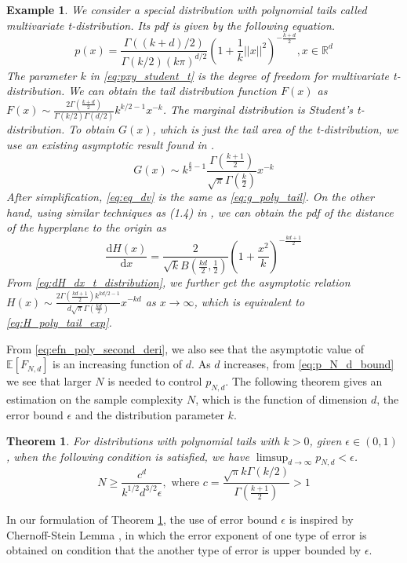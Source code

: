 \documentclass[conference,a4paper]{IEEEtran}
\def\E{\mathbb{E}}
\def\dd{\mathrm{d}}
\newtheorem{theorem}{Theorem}
\newtheorem{example}{Example}
\begin{document}
\begin{example}
     We consider a special distribution with polynomial tails called multivariate t-distribution.
     Its pdf is given by the following equation.
     \begin{equation}\label{eq:pxy_student_t}
          p(x) = \frac{\Gamma((k+d)/2)}{\Gamma(k/2)(k\pi)^{d/2}}
          \left(1+\frac{1}{k}||x||^2
          \right)^{-\frac{k+d}{2}}, x \in \mathbb{R}^d
      \end{equation}
      The parameter $k$ in \eqref{eq:pxy_student_t} is the degree of freedom for multivariate t-distribution.
      We can obtain the tail distribution function
      $F(x)$ as $F(x) \sim \frac{2\Gamma(\frac{k+d}{2})}{\Gamma(k/2)\Gamma(d/2)} k^{k/2-1} x^{-k}$.
      The marginal distribution is Student's t-distribution. To obtain $G(x)$, which is just the tail area
of the t-distribution, we use an existing asymptotic result found in \cite{andrew1976}.
\begin{equation} \label{eq:eq_dv}
    G(x) \sim k^{\frac{k}{2}-1} \frac{\Gamma \left(\frac{k+1}{2} \right)}
    {\sqrt{\pi} \Gamma\left(\frac{k}{2}\right)}x^{-k}
\end{equation}
After simplification, \eqref{eq:eq_dv} is the same as \eqref{eq:g_poly_tail}.
On the other hand, using similar techniques as (1.4) in \cite{raynaud1970enveloppe},
we can obtain the pdf of the distance of the hyperplane to the origin as
\begin{equation}\label{eq:dH_dx_t_distribution}
     \frac{\dd H(x)}{\dd x} =  \frac{2}{\sqrt{k} B(\frac{kd}{2},\frac{1}{2})} \left(1 + \frac{x^2}{k} \right)^{-\frac{kd+1}{2}} 
\end{equation}
From \eqref{eq:dH_dx_t_distribution}, we further get the asymptotic relation $H(x) \sim \frac{2 \Gamma(\frac{kd+1}{2}) k^{kd/2-1}}{d\sqrt{\pi} \Gamma(\frac{kd}{2})}
x^{-kd}$ as $x\to \infty$, which is equivalent to \eqref{eq:H_poly_tail_exp}.

\end{example}
From \eqref{eq:efn_poly_second_deri}, we also see that
the asymptotic value of $\E[F_{N,d}]$ is an increasing function of $d$.
As $d$ increases, from \eqref{eq:p_N_d_bound} we see that larger $N$ is needed to control $p_{N,d}$.
The following theorem gives an estimation on the sample complexity $N$,
which is the function of dimension $d$, the error bound $\epsilon$ and the distribution parameter $k$.
\begin{theorem}\label{thm:poly_tail_sample_complexity}
  For distributions with polynomial tails with $k>0$, given $\epsilon \in (0,1)$,
  when the following condition is satisfied,
  we have $\limsup_{d\to\infty} p_{N,d} < \epsilon$.
\begin{equation}\label{eq:N_c_d_3_2}
  N  \geq \frac{c^d}{k^{1/2}d^{3/2} \epsilon}, \textrm{ where } c=\frac{\sqrt{\pi}k\Gamma(k/2)}{\Gamma(\frac{k+1}{2})}>1  
\end{equation}
\end{theorem}
In our formulation of Theorem \ref{thm:poly_tail_sample_complexity},
the use of error bound $\epsilon$ is inspired by Chernoff-Stein Lemma \cite{cover1999elements},
in which the error exponent of one type of error is obtained on condition that the another type of error is upper bounded by $\epsilon$.
\end{document}
